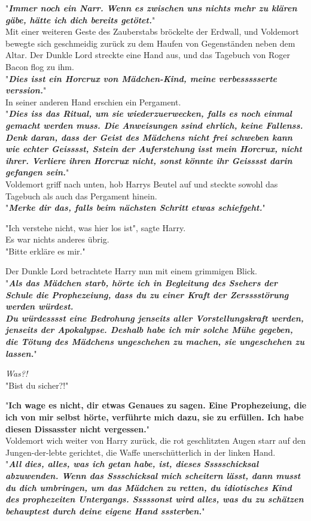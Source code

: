 {"\textbf{\emph{Immer noch ein Narr. Wenn es zwischen uns nichts mehr zu klären gäbe, hätte ich dich bereits getötet.}}"\\ Mit einer weiteren Geste des Zauberstabs bröckelte der Erdwall, und Voldemort bewegte sich geschmeidig zurück zu dem Haufen von Gegenständen neben dem Altar. Der Dunkle Lord streckte eine Hand aus, und das Tagebuch von Roger Bacon flog zu ihm.\\ "\textbf{\emph{Dies isst ein Horcrux von Mädchen-Kind, meine verbessssserte verssion.}}"\\ In seiner anderen Hand erschien ein Pergament.\\ "\textbf{\emph{Dies iss das Ritual, um sie wiederzuerwecken, falls es noch einmal gemacht werden muss. Die Anweisungen ssind ehrlich, keine Fallenss. Denk daran, dass der Geist des Mädchens nicht frei schweben kann wie echter Geisssst, Sstein der Auferstehung isst mein Horcrux, nicht ihrer. Verliere ihren Horcrux nicht, sonst könnte ihr Geisssst darin gefangen sein.}}"\\ Voldemort griff nach unten, hob Harrys Beutel auf und steckte sowohl das Tagebuch als auch das Pergament hinein.\\ "\textbf{\emph{Merke dir das, falls beim nächsten Schritt etwas schiefgeht.}}"

"Ich verstehe nicht, was hier los ist", sagte Harry.\\ Es war nichts anderes übrig.\\ "Bitte erkläre es mir."

Der Dunkle Lord betrachtete Harry nun mit einem grimmigen Blick.\\ "\textbf{\emph{Als das Mädchen starb, hörte ich in Begleitung des Ssehers der Schule die Prophezeiung, dass du zu einer Kraft der Zersssstörung werden würdest.\\ Du würdesssst eine Bedrohung jenseits aller Vorstellungskraft werden, jenseits der Apokalypse. Deshalb habe ich mir solche Mühe gegeben, die Tötung des Mädchens ungeschehen zu machen, sie ungeschehen zu lassen.}}"

\emph{Was?!}\\ "Bist du sicher?!"

"\textbf{Ich wage es nicht, dir etwas Genaues zu sagen. Eine Prophezeiung, die ich von mir selbst hörte, verführte mich dazu, sie zu erfüllen. Ich habe diesen Dissasster nicht vergessen.}"\\ Voldemort wich weiter von Harry zurück, die rot geschlitzten Augen starr auf den Jungen-der-lebte gerichtet, die Waffe unerschütterlich in der linken Hand.\\ "\textbf{\emph{All dies, alles, was ich getan habe, ist, dieses Ssssschicksal abzuwenden. Wenn das Sssschicksal mich scheitern lässt, dann musst du dich umbringen, um das Mädchen zu retten, du idiotisches Kind des prophezeiten Untergangs. Sssssonst wird alles, was du zu schätzen behauptest durch deine eigene Hand sssterben.}}"

}
